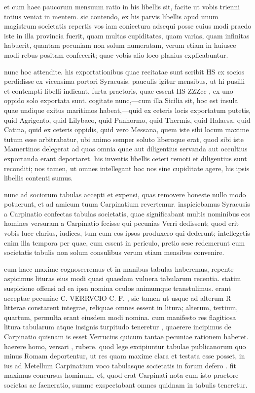  et cum haec paucorum mensuum ratio in his libellis sit, facite ut vobis trienni totius veniat in mentem. sic contendo, ex his parvis libellis apud unum magistrum societatis repertis vos iam coniectura adsequi posse cuius modi praedo iste in illa provincia fuerit, quam multas cupiditates, quam varias, quam infinitas habuerit, quantam pecuniam non solum numeratam, verum etiam in huiusce modi rebus positam confecerit; quae vobis alio loco planius explicabuntur.

 nunc hoc attendite. his exportationibus quae recitatae sunt scribit HS cx socios perdidisse ex vicensima portori Syracusis. pauculis igitur mensibus, ut hi pusilli et contempti libelli indicant, furta praetoris, quae essent HS ZZZcc , ex uno oppido solo exportata sunt. cogitate nunc,—cum illa Sicilia sit, hoc est insula quae undique exitus maritimos habeat,—quid ex ceteris locis exportatum putetis, quid Agrigento, quid Lilybaeo, quid Panhormo, quid Thermis, quid Halaesa, quid Catina, quid ex ceteris oppidis, quid vero Messana, quem iste sibi locum maxime tutum esse arbitrabatur, ubi animo semper soluto liberoque erat, quod sibi iste Mamertinos delegerat ad quos omnia quae aut diligentius servanda aut occultius exportanda erant deportaret. his inventis libellis ceteri remoti et diligentius sunt reconditi; nos tamen, ut omnes intellegant hoc nos sine cupiditate agere, his ipsis libellis contenti sumus.

 nunc ad sociorum tabulas accepti et expensi, quas removere honeste nullo modo potuerunt, et ad amicum tuum Carpinatium revertemur. inspiciebamus Syracusis a Carpinatio confectas tabulas societatis, quae significabant multis nominibus eos homines versuram a Carpinatio fecisse qui pecunias Verri dedissent; quod erit vobis luce clarius, iudices, tum cum eos ipsos produxero qui dederunt; intellegetis enim illa tempora per quae, cum essent in periculo, pretio sese redemerunt cum societatis tabulis non solum consulibus verum etiam mensibus convenire.

 cum haec maxime cognosceremus et in manibus tabulas haberemus, repente aspicimus lituras eius modi quasi quaedam vulnera tabularum recentia. statim suspicione offensi ad ea ipsa nomina oculos animumque transtulimus. erant acceptae pecuniae C. VERRVCIO C. F. , sic tamen ut usque ad alterum R litterae constarent integrae, reliquae omnes essent in litura; alterum, tertium, quartum, permulta erant eiusdem modi nomina. cum manifesto res flagitiosa litura tabularum atque insignis turpitudo teneretur , quaerere incipimus de Carpinatio quisnam is esset Verrucius quicum tantae pecuniae rationem haberet. haerere homo, versari , rubere. quod lege excipiuntur tabulae publicanorum quo minus Romam deportentur, ut res quam maxime clara et testata esse posset, in ius ad Metellum Carpinatium voco tabulasque societatis in forum defero . fit maximus concursus hominum, et, quod erat Carpinati nota cum isto praetore societas ac faeneratio, summe exspectabant omnes quidnam in tabulis teneretur.

